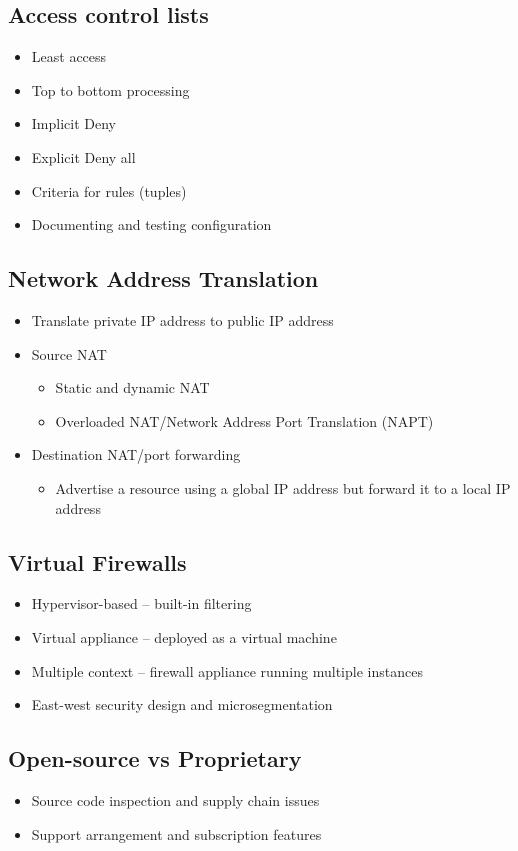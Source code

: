	\subsection {Access control lists}
		\begin{itemize}
			\item Least access
			\item Top to bottom processing
			\item Implicit Deny
			\item Explicit Deny all
			\item Criteria for rules (tuples)
			\item Documenting and testing configuration
		\end{itemize}
	\subsection {Network Address Translation}
		\begin{itemize}
			\item Translate private IP address to public IP address
			\item Source NAT
				\begin{itemize}
					\item Static and dynamic NAT
					\item Overloaded NAT/Network Address Port Translation (NAPT)
				\end{itemize}
			\item Destination NAT/port forwarding
				\begin{itemize}
					\item Advertise a resource using a global IP address but forward
						it to a local IP address
				\end{itemize}
		\end{itemize}
	\subsection {Virtual Firewalls}
		\begin{itemize}
			\item Hypervisor-based -- built-in filtering
			\item Virtual appliance -- deployed as a virtual machine
			\item Multiple context -- firewall appliance running multiple instances
			\item East-west security design and microsegmentation
		\end{itemize}
	\subsection {Open-source vs Proprietary}
		\begin{itemize}
			\item Source code inspection and supply chain issues
			\item Support arrangement and subscription features
		\end{itemize}

